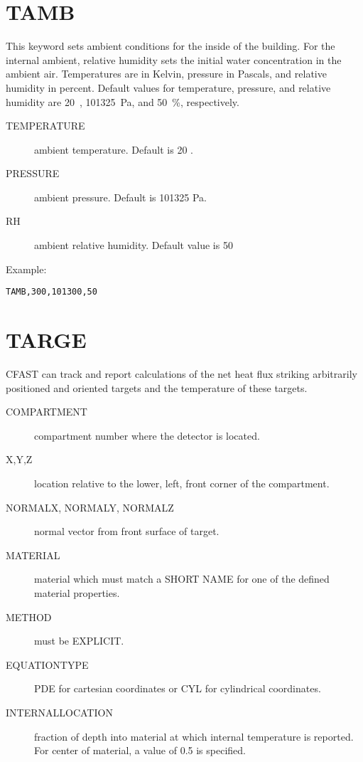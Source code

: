 \section{ TAMB}

This keyword sets ambient conditions for the inside of the building. For the internal ambient, relative humidity sets the initial water concentration in the ambient air.  Temperatures are in Kelvin, pressure in Pascals, and relative humidity in percent. Default values for temperature, pressure, and relative humidity are 20~\degc, 101325~Pa, and 50~\%, respectively.

\begin{adjustwidth}{1cm}{0cm}
\begin{description}
  \item[TEMPERATURE] ambient temperature. Default is 20 \degc.
  \item[PRESSURE] ambient pressure. Default is 101325 Pa.
  \item[RH] ambient relative humidity. Default value is 50 %
\end{description}
\end{adjustwidth}

\noindent Example:

\begin{lstlisting}
TAMB,300,101300,50
\end{lstlisting}

\section{TARGE}

CFAST can track and report calculations of the net heat flux striking arbitrarily positioned and oriented targets and the temperature of these targets. 

\begin{adjustwidth}{1cm}{0cm}
\begin{description}
  \item[COMPARTMENT] compartment number where the detector is located.
  \item[X,Y,Z] location relative to the lower, left, front corner of the compartment.
  \item[NORMALX, NORMALY, NORMALZ] normal vector from front surface of target.
  \item[MATERIAL] material which must match a SHORT NAME for one of the defined material properties.
  \item[METHOD] must be EXPLICIT.
  \item[EQUATIONTYPE] PDE for cartesian coordinates or CYL for cylindrical coordinates.
  \item[INTERNALLOCATION] fraction of depth into material at which internal temperature is reported. For center of material, a value of 0.5 is specified.
\end{description}
\end{adjustwidth}

